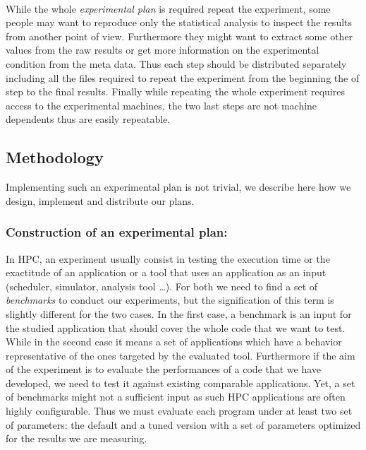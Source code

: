 \paragraph{}
While the whole \emph{experimental plan} is required repeat the experiment, some people may want to reproduce only the statistical analysis to inspect the results from another point of view.
Furthermore they might want to extract some other values from the raw results or get more information on the experimental condition from the meta data.
Thus each step should be distributed separately including all the files required to repeat the experiment from the beginning the of step to the final results.
Finally while repeating the whole experiment requires access to the experimental machines, the two last steps are not machine dependents thus are easily repeatable.

\subsection{Methodology}

Implementing such an experimental plan is not trivial, we describe here how we design, implement and distribute our plans.

\subsubsection{Construction of an experimental plan:}

In \gls{HPC}, an experiment usually consist in testing the execution time or the exactitude of an application or a tool that uses an application as an input (scheduler, simulator, analysis tool \ldots).
For both we need to find a set of \emph{benchmarks} to conduct our experiments, but the signification of this term is slightly different for the two cases.
In the first case, a benchmark is an input for the studied application that should cover the whole code that we want to test.
While in the second case it means a set of applications which have a behavior representative of the ones targeted by the evaluated tool.
Furthermore if the aim of the experiment is to evaluate the performances of a code that we have developed, we need to test it against existing comparable applications.
Yet, a set of benchmarks might not a sufficient input as such \gls{HPC} applications are often highly configurable.
Thus we must evaluate each program under at least two set of parameters: the default and a tuned version with a set of parameters optimized for the results we are measuring.

